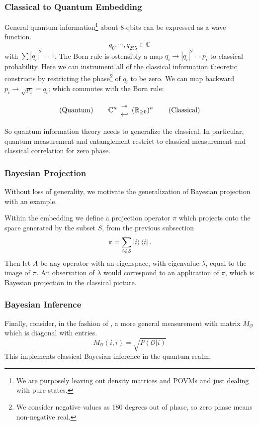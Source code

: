 \documentclass[12pt,a4paper]{article}
\begin{document}
\subsubsection{Classical to Quantum Embedding}
General quantum information\footnote{We are purposely leaving out density matrices and POVMs and just dealing with pure states.} about 8-qbits can be expressed as a wave function.
\[
   q_0,\cdots,q_{255} \in \mathbb{C}
\]
with $\sum |q_i|^2 = 1$.  The Born rule is ostensibly a map $q_i \rightarrow |q_i|^2 = p_i$ to classical probability.  Here we can instrument all of the classical information theoretic constructs by restricting the phase\footnote{We consider negative values as 180 degrees out of phase, so zero phase means non-negative real.} of $q_i$ to be zero.  We can map backward $p_i \rightarrow \sqrt{p_i} = q_i$; which commutes with the Born rule:

{
\renewcommand{\arraystretch}{0.1}
\[
\text{(Quantum)} \hspace{0.3 in}
\mathbb{C}^n \begin{array}{c} \twoheadrightarrow \\ \hookleftarrow \end{array}
(\mathbb{R}_{\ge 0})^n
\hspace{0.3 in} \text{(Classical)} 
\]
}

So quantum information theory needs to generalize the classical.  In particular, quantum measurement and entanglement restrict to classical measurement and classical correlation for zero phase.

\subsubsection{Bayesian Projection}
Without loss of generality, we motivate the generalization of Bayesian projection with an example.

Within the embedding we define a projection operator $\pi$ which projects onto the space generated by the subset $S$, from the previous subsection
\[
\pi = \sum_{i \in S} \ket{i} \bra{i}.
\]
Then let $A$ be any operator with an eigenspace, with eigenvalue $\lambda$, equal to the image of $\pi$.  An observation of $\lambda$ would correspond to an application of $\pi$, which is Bayesian projection in the classical picture.

\subsubsection{Bayesian Inference}
Finally, consider, in the fashion of \cite{nielsenchuang}, a more general measurement with matrix $M_\mathcal{O}$ which is diagonal with entries.
\[
   M_\mathcal{O}(i,i) = \sqrt{P(\mathcal{O} | i)}
\]
This implements classical Bayesian inference in the quantum realm.
\end{document}
